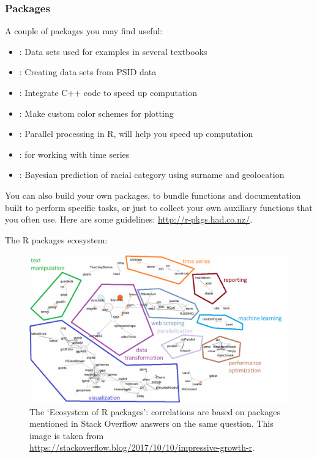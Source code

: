 \documentclass{beamer}
\begin{document}
\begin{frame}[allowframebreaks]
 \frametitle{Packages}
    
    A couple of packages you may find useful:
	\begin{itemize}
        \item
        : Data sets used for examples in several textbooks
        \item
        : Creating data sets from PSID data
        \item
        : Integrate C++ code to speed up computation
        \item
        : Make custom color schemes for plotting
        \item
        : Parallel processing in R, will help you speed up computation
        \item
        : for working with time series
	    \item
	    : Bayesian prediction of racial category using surname and geolocation
	\end{itemize}
	
	
	You can also build your own packages, to bundle functions and documentation built to perform specific tasks, or just to collect your own auxiliary functions that you often use. Here are some guidelines: \scriptsize\url{http://r-pkgs.had.co.nz/}\normalsize.
	
	\vskip10cm
	
	The R packages ecosystem:
		\begin{figure}
		\centering
		\includegraphics[width=.8\textwidth]{figures/rpackages_eco_cat}
		\caption{\scriptsize The `Ecosystem of R packages': correlations are based on packages mentioned in Stack Overflow answers on the same question. This image is taken from \tiny\url{https://stackoverflow.blog/2017/10/10/impressive-growth-r}\scriptsize.}
		\label{Fig: 1}
		\end{figure}
	
\end{frame}
\end{document}
